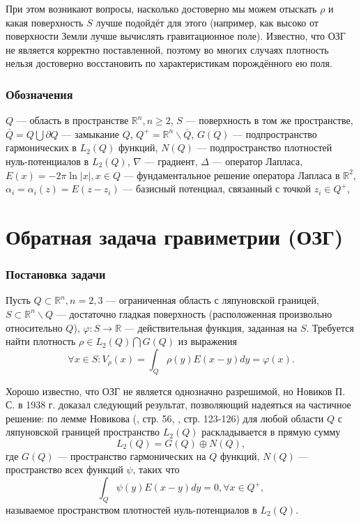 \documentclass[a4paper, 12pt]{article}
\newcommand{\V}[1]{\int_Q #1(y) E(x-y) dy}
\newcommand{\R}[1]{\mathbb{R}^#1}
\begin{document}
При этом возникают вопросы, насколько достоверно мы можем отыскать $\rho$ и какая поверхность $S$ лучше подойдёт для этого (например, как высоко от поверхности Земли лучше вычислять гравитационное поле).
Известно, что ОЗГ не является корректно поставленной, поэтому во многих случаях плотность нельзя достоверно восстановить по характеристикам  порождённого ею поля. 

\section*{Обозначения}
$Q$ --- область в пространстве $\mathbb{R}^n, n\geq 2$, $S$ --- поверхность в том же пространстве,
$\bar Q = Q \bigcup \partial Q$ --- замыкание $Q$,
$Q^+= \R{n}\backslash \bar Q$,
$G(Q)$ --- подпространство гармонических в $L_2(Q)$ функций, $N(Q)$ --- подпространство плотностей нуль-потенциалов в $L_2(Q)$,
$\nabla$ --- градиент,
$\Delta$ --- оператор Лапласа,
$E(x)= -2\pi \ln |x|, x \in Q$ --- фундаментальное решение оператора Лапласа в $\R{2}$,
$\alpha_i=\alpha_i(z)=E(z-z_i)$ --- базисный потенциал, связанный с точкой $z_i \in Q^+$,



\part{Обратная задача гравиметрии (ОЗГ)}

\section{Постановка задачи}
Пусть $Q\subset \R{n}, n=2,3$ --- ограниченная область с ляпуновской границей,
$S \subset \R{n}\backslash Q$ --- достаточно гладкая поверхность (расположенная произвольно относительно $Q$), $\varphi: S \rightarrow \mathbb{R}$ --- действительная функция, заданная на $S$.
Требуется найти плотность $\rho \in L_2(Q) \bigcap G(Q)$ из выражения
\begin{equation}
    \forall x \in S: V_\rho(x)= \V{\rho}= \varphi(x).
\end{equation}

Хорошо известно, что ОЗГ не является однозначно разрешимой, но Новиков П. С. в 1938 г. доказал следующий результат, позволяющий надеяться на частичное решение:
по лемме Новикова (\cite{lezh}, стр. 56, \cite{nov}, стр. 123-126) для любой области $Q$ с ляпуновской границей пространство $L_2(Q)$ раскладывается в прямую сумму 
\begin{equation}
    L_2(Q)= G(Q) \oplus N(Q),
\end{equation}
где $G(Q)$ --- пространство гармонических на $Q$ функций, $N(Q)$ --- пространство всех функций $\psi$, таких что
\begin{equation}
    \V{\psi}=0, \forall x\in Q^+,
\end{equation}
называемое пространством плотностей нуль-потенциалов в $L_2(Q)$.
\end{document}
